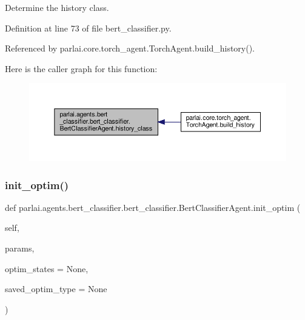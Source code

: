 \begin{DoxyVerb}Determine the history class.\end{DoxyVerb}
 

Definition at line 73 of file bert\+\_\+classifier.\+py.



Referenced by parlai.\+core.\+torch\+\_\+agent.\+Torch\+Agent.\+build\+\_\+history().

Here is the caller graph for this function\+:
\nopagebreak
\begin{figure}[H]
\begin{center}
\leavevmode
\includegraphics[width=350pt]{classparlai_1_1agents_1_1bert__classifier_1_1bert__classifier_1_1BertClassifierAgent_ad606525729dd0340fc98a0bb50e24187_icgraph}
\end{center}
\end{figure}
\mbox{\label{classparlai_1_1agents_1_1bert__classifier_1_1bert__classifier_1_1BertClassifierAgent_aaf78ab1d312861ef4ba73bc7813e68aa}} 
\subsubsection{\texorpdfstring{init\+\_\+optim()}{init\_optim()}}
{\footnotesize\ttfamily def parlai.\+agents.\+bert\+\_\+classifier.\+bert\+\_\+classifier.\+Bert\+Classifier\+Agent.\+init\+\_\+optim (\begin{DoxyParamCaption}\item[{}]{self,  }\item[{}]{params,  }\item[{}]{optim\+\_\+states = {\ttfamily None},  }\item[{}]{saved\+\_\+optim\+\_\+type = {\ttfamily None} }\end{DoxyParamCaption})}

